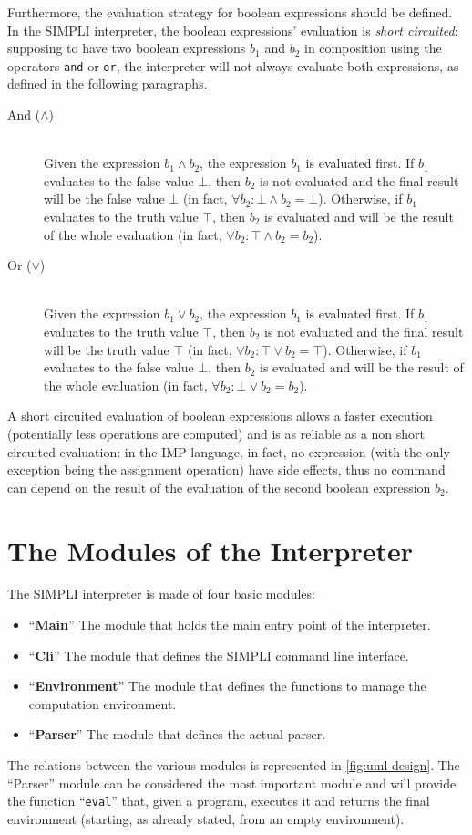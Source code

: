 \documentclass{esposito-documentation}
\begin{document}
Furthermore, the evaluation strategy for boolean expressions should be defined.
In the SIMPLI interpreter, the boolean expressions' evaluation is \emph{short
circuited}: supposing to have two boolean expressions $b_1$ and $b_2$ in
composition using the operators \texttt{and} or \texttt{or}, the interpreter
will not always evaluate both expressions, as defined in the following
paragraphs.
\begin{description}
	\item[And ($\land$)] \hfill \\
		Given the expression $b_1 \land b_2$, the expression $b_1$ is evaluated
		first. If $b_1$ evaluates to the false value $\bot$, then $b_2$ is not
		evaluated and the final result will be the false value $\bot$ (in fact,
		$\forall b_2: \bot \land b_2 = \bot$).  Otherwise, if $b_1$ evaluates
		to the truth value $\top$, then $b_2$ is evaluated and will be the
		result of the whole evaluation (in fact, $\forall b_2: \top\land
		b_2=b_2$).
	\item[Or ($\vee$)] \hfill \\
		Given the expression $b_1 \vee b_2$, the expression $b_1$ is evaluated
		first. If $b_1$ evaluates to the truth value $\top$, then $b_2$ is not
		evaluated and the final result will be the truth value $\top$ (in fact,
		$\forall b_2: \top \vee b_2 = \top$).  Otherwise, if $b_1$ evaluates to
		the false value $\bot$, then $b_2$ is evaluated and will be the result
		of the whole evaluation (in fact, $\forall b_2: \bot\vee b_2=b_2$).
\end{description}

A short circuited evaluation of boolean expressions allows a faster execution
(potentially less operations are computed) and is as reliable as a non short
circuited evaluation: in the IMP language, in fact, no expression (with the
only exception being the assignment operation) have side effects, thus no
command can depend on the result of the evaluation of the second boolean
expression $b_2$.

\section{The Modules of the Interpreter}

The SIMPLI interpreter is made of four basic modules:
\begin{itemize}
	\item ``\textbf{Main}'' The module that holds the main entry point of the
		interpreter.
	\item ``\textbf{Cli}'' The module that defines the SIMPLI command line
		interface.
	\item ``\textbf{Environment}'' The module that defines the functions to
		manage the computation environment.
	\item ``\textbf{Parser}'' The module that defines the actual parser.
\end{itemize}
The relations between the various modules is represented in
\autoref{fig:uml-design}. The ``Parser'' module can be considered the most
important module and will provide the function ``\texttt{eval}'' that, given a
program, executes it and returns the final environment (starting, as already
stated, from an empty environment).
\end{document}
